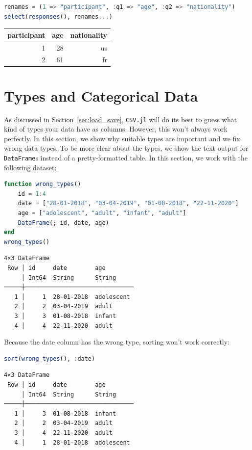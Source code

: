 \documentclass[
  notoc %
]{tufte-book}
\newcommand{\passthrough}[1]{#1}
\begin{document}
\begin{lstlisting}[language=Julia]
renames = (1 => "participant", :q1 => "age", :q2 => "nationality")
select(responses(), renames...)
\end{lstlisting}

\begin{longtable}[]{@{}rrr@{}}
\toprule
participant & age & nationality \\
\midrule
\endhead
1 & 28 & us \\
2 & 61 & fr \\
\bottomrule
\end{longtable}

\hypertarget{sec:types}{%
\section{Types and Categorical Data}\label{sec:types}}

As discussed in Section~\ref{sec:load_save},
\passthrough{\lstinline!CSV.jl!} will do its best to guess what kind of
types your data have as columns. However, this won't always work
perfectly. In this section, we show why suitable types are important and
we fix wrong data types. To be more clear about the types, we show the
text output for \passthrough{\lstinline!DataFrame!}s instead of a
pretty-formatted table. In this section, we work with the following
dataset:

\begin{lstlisting}[language=Julia]
function wrong_types()
    id = 1:4
    date = ["28-01-2018", "03-04-2019", "01-08-2018", "22-11-2020"]
    age = ["adolescent", "adult", "infant", "adult"]
    DataFrame(; id, date, age)
end
wrong_types()
\end{lstlisting}

\begin{lstlisting}[language=Output]
4×3 DataFrame
 Row │ id     date        age
     │ Int64  String      String
─────┼───────────────────────────────
   1 │     1  28-01-2018  adolescent
   2 │     2  03-04-2019  adult
   3 │     3  01-08-2018  infant
   4 │     4  22-11-2020  adult
\end{lstlisting}

Because the date column has the wrong type, sorting won't work
correctly:

\begin{lstlisting}[language=Julia]
sort(wrong_types(), :date)
\end{lstlisting}

\begin{lstlisting}[language=Output]
4×3 DataFrame
 Row │ id     date        age
     │ Int64  String      String
─────┼───────────────────────────────
   1 │     3  01-08-2018  infant
   2 │     2  03-04-2019  adult
   3 │     4  22-11-2020  adult
   4 │     1  28-01-2018  adolescent
\end{lstlisting}
\end{document}
